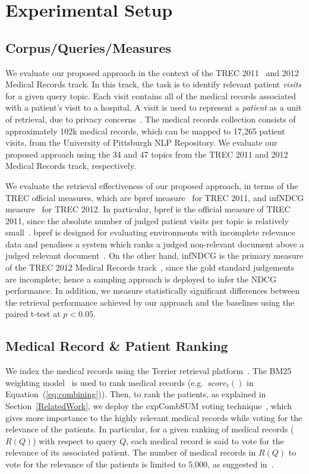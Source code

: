 \documentclass[1p]{elsarticle}
\begin{document}
\section{Experimental Setup}\label{c7sSetup}

\subsection{Corpus/Queries/Measures}
We evaluate our proposed approach in the context of the TREC 2011~\cite{voorhees2011trec} and 2012~\cite{voorhees2012trec} Medical Records track.
In this track, the task is to identify relevant patient \emph{visits} for a given query topic. Each visit contains all of the medical records associated with a patient's visit to a hospital. A visit is used to represent a \emph{patient} as a unit of retrieval, due to privacy concerns~\cite{voorhees2011trec}. The medical records collection consists of approximately 102k medical records, which can be mapped to 17,265 patient visits, from the University of Pittsburgh NLP Repository. We evaluate our proposed approach using the 34 and 47 topics from the TREC 2011 and 2012 Medical Records track, respectively.

We evaluate the retrieval effectiveness of our proposed approach, in terms of the TREC official measures, which are bpref measure~\cite{buckley2004sigir} for TREC 2011, and infNDCG measure~\cite{yilmaz2008sigir} for TREC 2012. In particular, bpref is the official measure of TREC 2011, since the absolute number of judged patient visits per topic is relatively small~\cite{voorhees2011trec}. bpref is designed for evaluating environments with incomplete relevance data and penalises a system which ranks a judged non-relevant document above a judged relevant document~\cite{buckley2004sigir}. On the other hand, infNDCG is the primary measure of the TREC 2012 Medical Records track~\cite{voorhees2012trec}, since the gold standard judgements are incomplete; hence a sampling approach is deployed to infer the NDCG performance. In addition, we measure statistically significant differences between the retrieval performance achieved by our approach and the baselines using the paired t-test at $p < 0.05$.

\subsection{Medical Record \& Patient Ranking}
 We index the medical records using the Terrier retrieval platform~\cite{ounis06terrier-osir}. The BM25 weighting model~\cite{robertson1994sigir} is used to rank medical records (e.g.\ $score_t()$ in Equation~(\ref{eq:combining})).
Then, to rank the patients, as explained in Section~\ref{RelatedWork}, we deploy the expCombSUM 
voting technique~\cite{macdonald2006cikm}, which gives more importance to the highly relevant medical records while voting for the relevance of the patients. 
In particular, for a given ranking of medical records ($R(Q)$) with respect to query $Q$, each medical record is said to vote for the relevance of its associated patient. The number of medical records in $R(Q)$ to vote for the relevance of the patients is limited to 5,000, as suggested in~\cite{limsopatham2011trec}. 
\end{document}

